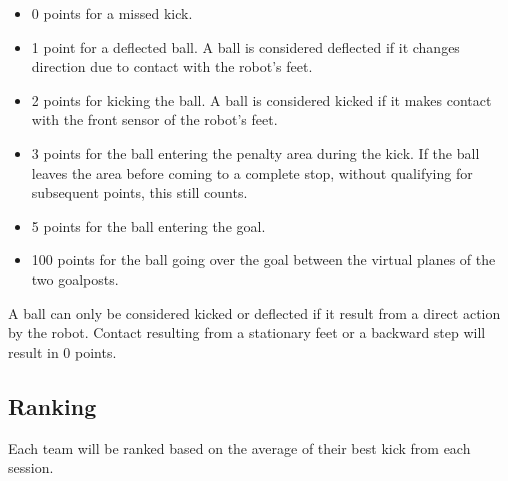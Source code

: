 \begin{itemize}
	\item 0 points for a missed kick.
	\item 1 point for a deflected ball.
	A ball is considered deflected if it changes direction due to contact with the robot's feet.
	\item 2 points for kicking the ball.
	A ball is considered kicked if it makes contact with the front sensor of the robot's feet.
	\item 3 points for the ball entering the penalty area during the kick. 
	If the ball leaves the area before coming to a complete stop, without qualifying for subsequent points, this still counts. 
	\item 5 points for the ball entering the goal. 
	\item 100 points for the ball going over the goal between the virtual planes of the two goalposts. 
  \end{itemize}

  A ball can only be considered kicked or deflected if it result from a direct action by the robot.
  Contact resulting from a stationary feet or a backward step will result in 0 points.

  \subsection{Ranking}

  Each team will be ranked based on the average of their best kick from each session.